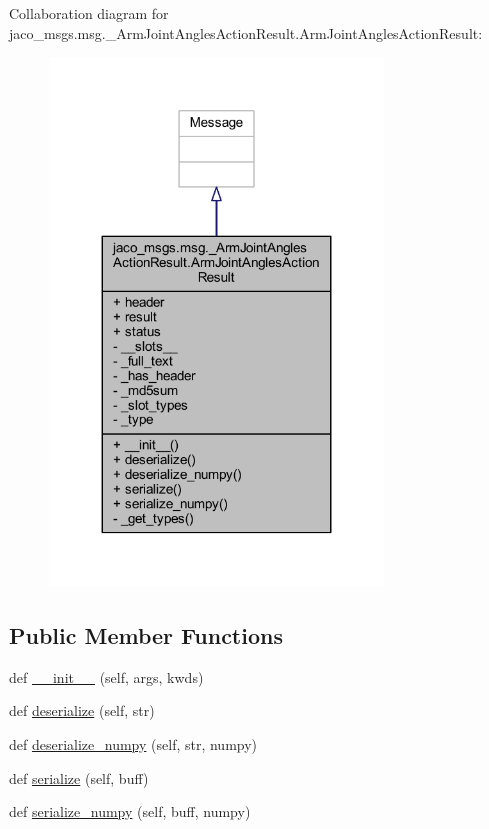 Collaboration diagram for jaco\+\_\+msgs.\+msg.\+\_\+\+Arm\+Joint\+Angles\+Action\+Result.\+Arm\+Joint\+Angles\+Action\+Result\+:
\nopagebreak
\begin{figure}[H]
\begin{center}
\leavevmode
\includegraphics[width=251pt]{d2/d22/classjaco__msgs_1_1msg_1_1__ArmJointAnglesActionResult_1_1ArmJointAnglesActionResult__coll__graph}
\end{center}
\end{figure}
\subsection*{Public Member Functions}
\begin{DoxyCompactItemize}
\item 
def \hyperlink{classjaco__msgs_1_1msg_1_1__ArmJointAnglesActionResult_1_1ArmJointAnglesActionResult_ab44fdfb36193b49f44bddb471dd563be}{\+\_\+\+\_\+init\+\_\+\+\_\+} (self, args, kwds)
\item 
def \hyperlink{classjaco__msgs_1_1msg_1_1__ArmJointAnglesActionResult_1_1ArmJointAnglesActionResult_a1f4a105e255846a8e5431ee4680985d8}{deserialize} (self, str)
\item 
def \hyperlink{classjaco__msgs_1_1msg_1_1__ArmJointAnglesActionResult_1_1ArmJointAnglesActionResult_a9547604ffef61e4d454f3a06e8912595}{deserialize\+\_\+numpy} (self, str, numpy)
\item 
def \hyperlink{classjaco__msgs_1_1msg_1_1__ArmJointAnglesActionResult_1_1ArmJointAnglesActionResult_afa332cb824fdfda40a6a112a77daac81}{serialize} (self, buff)
\item 
def \hyperlink{classjaco__msgs_1_1msg_1_1__ArmJointAnglesActionResult_1_1ArmJointAnglesActionResult_a9984b60b5df8d6b91e16727f2d490e78}{serialize\+\_\+numpy} (self, buff, numpy)
\end{DoxyCompactItemize}
